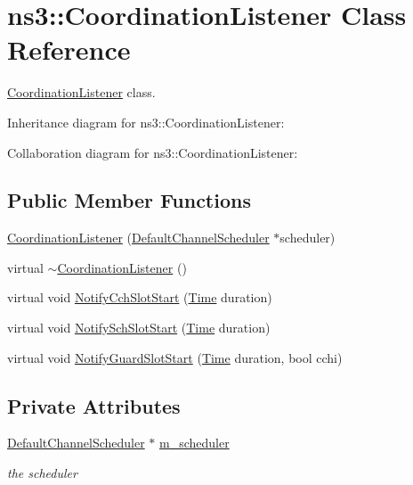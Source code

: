 \hypertarget{classns3_1_1CoordinationListener}{}\section{ns3\+:\+:Coordination\+Listener Class Reference}
\label{classns3_1_1CoordinationListener}


\hyperlink{classns3_1_1CoordinationListener}{Coordination\+Listener} class.  




Inheritance diagram for ns3\+:\+:Coordination\+Listener\+:


Collaboration diagram for ns3\+:\+:Coordination\+Listener\+:
\subsection*{Public Member Functions}
\begin{DoxyCompactItemize}
\item 
\hyperlink{classns3_1_1CoordinationListener_a2cc42e07c7a9d5fbfc16851b48b20cb7}{Coordination\+Listener} (\hyperlink{classns3_1_1DefaultChannelScheduler}{Default\+Channel\+Scheduler} $\ast$scheduler)
\item 
virtual \hyperlink{classns3_1_1CoordinationListener_a9e0b238b2b0e92d109e9507f2bd8baac}{$\sim$\+Coordination\+Listener} ()
\item 
virtual void \hyperlink{classns3_1_1CoordinationListener_a2f95a49b9485cf121678825cd868559b}{Notify\+Cch\+Slot\+Start} (\hyperlink{classns3_1_1Time}{Time} duration)
\item 
virtual void \hyperlink{classns3_1_1CoordinationListener_ae8321f0fe1cf56c7af0fe37c5f930079}{Notify\+Sch\+Slot\+Start} (\hyperlink{classns3_1_1Time}{Time} duration)
\item 
virtual void \hyperlink{classns3_1_1CoordinationListener_aabcf712cd90eee208ce4007298e0e833}{Notify\+Guard\+Slot\+Start} (\hyperlink{classns3_1_1Time}{Time} duration, bool cchi)
\end{DoxyCompactItemize}
\subsection*{Private Attributes}
\begin{DoxyCompactItemize}
\item 
\hyperlink{classns3_1_1DefaultChannelScheduler}{Default\+Channel\+Scheduler} $\ast$ \hyperlink{classns3_1_1CoordinationListener_a4fe2f8b72129c51275e086b09c3171a7}{m\+\_\+scheduler}
\begin{DoxyCompactList}\small\item\em the scheduler \end{DoxyCompactList}\end{DoxyCompactItemize}
